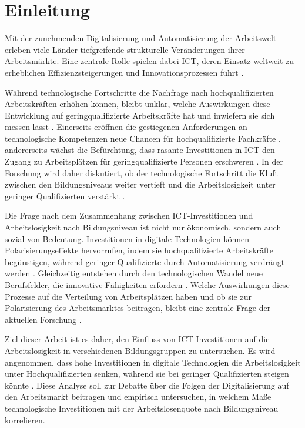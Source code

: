 
\section{Einleitung}

Mit der zunehmenden Digitalisierung und Automatisierung der Arbeitswelt erleben viele 
Länder tiefgreifende strukturelle Veränderungen ihrer Arbeitsmärkte. Eine zentrale Rolle 
spielen dabei \ac{ICT}, deren Einsatz weltweit zu erheblichen Effizienzsteigerungen und 
Innovationsprozessen führt \parencite[vgl.][S. 90–93]{brynjolfsson2015thesecond}.

Während technologische Fortschritte die Nachfrage nach hochqualifizierten Arbeitskräften 
erhöhen können, bleibt unklar, welche Auswirkungen diese Entwicklung auf 
geringqualifizierte Arbeitskräfte hat und inwiefern sie sich messen lässt 
\parencite[vgl.][S. 1045]{acemoglu2011skills}. Einerseits eröffnen die gestiegenen 
Anforderungen an technologische Kompetenzen neue Chancen für hochqualifizierte Fachkräfte 
\parencite[vgl.][S. 1070]{acemoglu2011skills}, andererseits wächst die Befürchtung, dass 
rasante Investitionen in \ac{ICT} den Zugang zu Arbeitsplätzen für geringqualifizierte 
Personen erschweren \parencite[vgl.][S. 14-15]{frey2013thefuture}. In der Forschung wird 
daher diskutiert, ob der technologische Fortschritt die Kluft zwischen den 
Bildungsniveaus weiter vertieft und die Arbeitslosigkeit unter geringer 
Qualifizierten verstärkt \parencite[vgl.][S. 2–4]{balsmeier2019isthis}.

Die Frage nach dem Zusammenhang zwischen \ac{ICT}-Investitionen und Arbeitslosigkeit 
nach Bildungsniveau ist nicht nur ökonomisch, sondern auch sozial von Bedeutung. 
Investitionen in digitale Technologien können Polarisierungseffekte hervorrufen, 
indem sie hochqualifizierte Arbeitskräfte begünstigen, während geringer Qualifizierte 
durch Automatisierung verdrängt werden \parencite[vgl.][S. 14–15]{frey2013thefuture}. 
Gleichzeitig entstehen durch den technologischen Wandel neue Berufsfelder, die 
innovative Fähigkeiten erfordern \parencite[vgl.][S. 3–6]{brynjolfsson2015thesecond}. 
Welche Auswirkungen diese Prozesse auf die Verteilung von Arbeitsplätzen haben und 
ob sie zur Polarisierung des Arbeitsmarktes beitragen, bleibt eine zentrale Frage der 
aktuellen Forschung \parencite[vgl.][S. 2–4]{balsmeier2019isthis}.

Ziel dieser Arbeit ist es daher, den Einfluss von \ac{ICT}-Investitionen auf die 
Arbeitslosigkeit in verschiedenen Bildungsgruppen zu untersuchen. Es wird angenommen, 
dass hohe Investitionen in digitale Technologien die Arbeitslosigkeit unter 
Hochqualifizierten senken, während sie bei geringer Qualifizierten steigen könnte 
\parencite[vgl.][S. 1045]{acemoglu2011skills}. Diese Analyse soll zur Debatte über die 
Folgen der Digitalisierung auf den Arbeitsmarkt beitragen und empirisch untersuchen, 
in welchem Maße technologische Investitionen mit der Arbeitslosenquote nach 
Bildungsniveau korrelieren.

